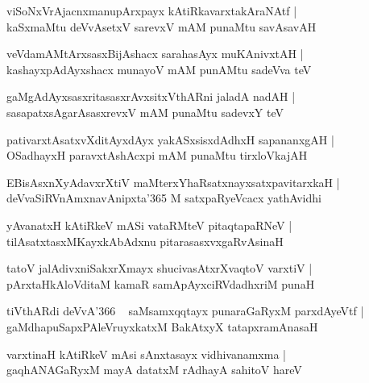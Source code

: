 \documentclass[twoside,12pt,openright]{book}
\newcounter{shloka}[chapter]
\begin{document}
\begin{shloka}%
viSoNxVrAjacnxmanupArxpayx kAtiRkavarxtakAraNAtf |\\
kaSxmaMtu deVvAsetxV sarevxV mAM punaMtu savAsavAH 
\end{shloka}

\begin{shloka}%
veVdamAMtArxsasxBijAshacx sarahasAyx muKAnivxtAH |\\
kashayxpAdAyxshacx munayoV mAM punAMtu sadeVva teV 
\end{shloka}

\begin{shloka}%
gaMgAdAyxsasxritasasxrAvxsitxVthARni jaladA nadAH |\\
sasapatxsAgarAsasxrevxV mAM punaMtu sadevxY teV
\end{shloka}

\begin{shloka}%
pativarxtAsatxvXditAyxdAyx yakASxsisxdAdhxH sapananxgAH |\\
OSadhayxH paravxtAshAcxpi mAM punaMtu tirxloVkajAH 
\end{shloka}

\begin{shloka}%
EBisAsxnXyAdavxrXtiV maMterxYhaRsatxnayxsatxpavitarxkaH |\\
deVvaSiRVnAmxnavAnipxta\char'365 M satxpaRyeVcacx yathAvidhi
\end{shloka}

\begin{shloka}%
yAvanatxH kAtiRkeV mASi vataRMteV pitaqtapaRNeV |\\
tilAsatxtasxMKayxkAbAdxnu pitarasasxvxgaRvAsinaH 
\end{shloka}

\begin{shloka}%
tatoV jalAdivxniSakxrXmayx shucivasAtxrXvaqtoV varxtiV |\\
pArxtaHkAloVditaM kamaR samApAyxciRVdadhxriM punaH 
\end{shloka}

\begin{shloka}%
tiVthARdi deVvA\char'366 ~ saMsamxqqtayx punaraGaRyxM parxdAyeVtf |\\
gaMdhapuSapxPAleVruyxkatxM BakAtxyX tatapxramAnasaH 
\end{shloka}

\begin{shloka}%
varxtinaH kAtiRkeV mAsi sAnxtasayx vidhivanamxma |\\
gaqhANAGaRyxM mayA datatxM rAdhayA sahitoV hareV 
\end{shloka}
\end{document}
